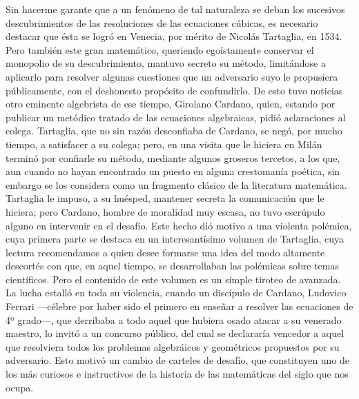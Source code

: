 \documentclass[a4paper, 12pt, draft]{article}
\begin{document}
{Sin hacerme garante que a un fenómeno de tal naturaleza se deban los sucesivos descubrimientos de las resoluciones de las ecuaciones cúbicas, es necesario destacar que ésta se logró en Venecia, por mérito de Nicolás Tartaglia, en 1534. Pero también este gran matemático, queriendo egoístamente conservar el monopolio de su descubrimiento, mantuvo secreto su método, limitándose a aplicarlo para resolver algunas cuestiones que un adversario suyo le propusiera públicamente, con el deshonesto propósito de confundirlo. De esto tuvo noticias otro eminente algebrista de ese tiempo, Girolano Cardano, quien, estando por publicar un metódico tratado de las ecuaciones algebraicas, pidió aclaraciones al colega. Tartaglia, que no sin razón desconfiaba de Cardano, se negó, por mucho tiempo, a satisfacer a su colega; pero, en una visita que le hiciera en Milán terminó por confiarle su método, mediante algunos groseros tercetos, a los que, aun cuando no hayan encontrado un puesto en alguna crestomanía poética, sin embargo se los considera como un fragmento clásico de la literatura matemática. Tartaglia le impuso, a su huésped, mantener secreta la comunicación que le hiciera; pero Cardano, hombre de moralidad muy escasa, no tuvo escrúpulo alguno en intervenir en el desafío. Este hecho dió motivo a una violenta polémica, cuya primera parte se destaca en un interesantísimo volumen de Tartaglia, cuya lectura recomendamos a quien desee formarse una idea del modo altamente descortés con que, en aquel
tiempo, se desarrollaban las polémicas sobre temas científicos. Pero el contenido de este volumen es un simple tiroteo de avanzada. La lucha estalló en toda su violencia, cuando un discípulo de Cardano, Ludovico Ferrari ---célebre por haber sido el primero en enseñar a resolver las ecuaciones de 4º grado---, que derribaba a todo aquel que hubiera osado atacar a su venerado maestro, lo invitó a un concurso público, del cual se declararía vencedor a aquel que resolviera todos los problemas algebráicos y geométricos propuestos por su adversario. Esto motivó un cambio de carteles de desafío, que constituyen uno de los más curiosos e instructivos de la historia de las matemáticas del siglo que nos ocupa.

}
\end{document}
